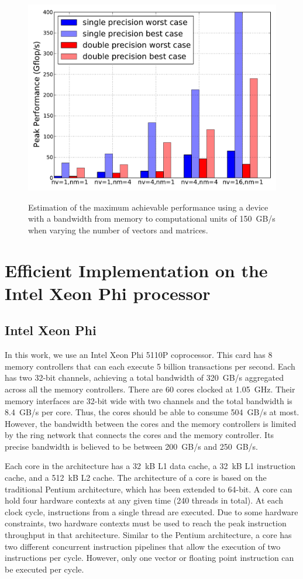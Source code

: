 \documentclass{sig-alternate}
\begin{document}
\begin{figure}
  \centering 
  \includegraphics[width=.9\linewidth]{figures/gflops_peak.pdf}\label{fig:gflops-peak-perf}
  \caption{Estimation of the maximum achievable performance using a
    device with a bandwidth from memory to computational units of 150~GB/s when
    varying the number of vectors and matrices.}
  \label{fig:perf_predict}
\end{figure}

\section{Efficient Implementation on the Intel Xeon Phi processor}
\label{sec:impl}

\subsection{Intel Xeon Phi}

In this work, we use an Intel Xeon Phi 5110P coprocessor. This card
has 8 memory controllers that can each execute 5 billion
transactions per second. Each has two 32-bit channels, achieving a total
bandwidth of 320~GB/s aggregated across all the memory
controllers. There are 60 cores clocked at 1.05~GHz. Their memory
interfaces are 32-bit wide with two channels and the total bandwidth
is 8.4~GB/s per core. Thus, the cores should be able to consume 504~GB/s
at most. However, the bandwidth between the cores and the memory
controllers is limited by the ring network that connects the cores and
the memory controller. Its precise bandwidth is
believed to be between 200~GB/s and 250~GB/s.

Each core in the architecture has a 32~kB L1 data cache, a 32~kB L1
instruction cache, and a 512~kB L2 cache. The architecture of a core is
based on the traditional Pentium architecture, which has been extended to
64-bit. A core can hold four hardware contexts at any given time (240 threads in total). At each
clock cycle, instructions from a single thread are executed. Due to
some hardware constraints, two hardware contexts must be used to reach
the peak instruction throughput in that architecture. Similar to the
Pentium architecture, a core has two different concurrent instruction
pipelines that allow the execution of two instructions per
cycle. However, only one vector or floating point instruction can be
executed per cycle.
\end{document}
